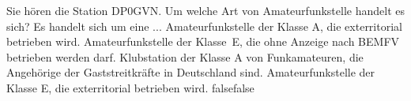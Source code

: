     {Sie hören die Station DP0GVN. Um welche Art von Amateurfunkstelle handelt es sich? Es handelt sich um eine ...}
    {Amateurfunkstelle der Klasse A, die exterritorial betrieben wird.}
    {Amateurfunkstelle der Klasse E, die ohne Anzeige nach BEMFV betrieben werden darf.}
    {Klubstation der Klasse A von Funkamateuren, die Angehörige der Gaststreitkräfte in Deutschland sind.}
    {Amateurfunkstelle der Klasse E, die exterritorial betrieben wird.}
    {false}{false}